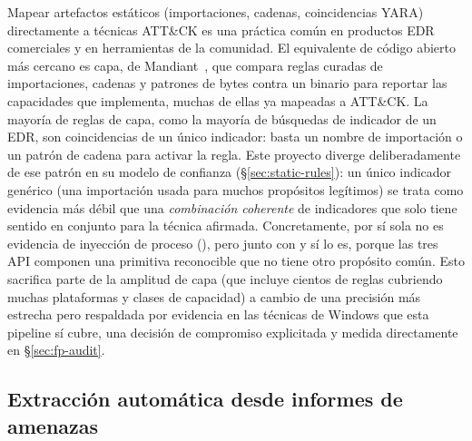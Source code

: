 Mapear artefactos est\'aticos (importaciones, cadenas, coincidencias
YARA) directamente a t\'ecnicas ATT\&CK es una pr\'actica com\'un en
productos EDR comerciales y en herramientas de la comunidad. El
equivalente de c\'odigo abierto m\'as cercano es capa, de
Mandiant~\cite{capa}, que compara reglas curadas de importaciones,
cadenas y patrones de bytes contra un binario para reportar las
capacidades que implementa, muchas de ellas ya mapeadas a ATT\&CK. La
mayor\'ia de reglas de capa, como la mayor\'ia de b\'usquedas de
indicador de un EDR, son coincidencias de un \'unico indicador: basta
un nombre de importaci\'on o un patr\'on de cadena para activar la
regla. Este proyecto diverge deliberadamente de ese patr\'on en su
modelo de confianza (\S\ref{sec:static-rules}): un \'unico indicador
gen\'erico (una importaci\'on usada para muchos prop\'ositos
leg\'itimos) se trata como evidencia m\'as d\'ebil que una
\emph{combinaci\'on coherente} de indicadores que solo tiene sentido en
conjunto para la t\'ecnica afirmada. Concretamente,
 por s\'i sola no es evidencia de inyecci\'on de
proceso (), pero  junto con
 y  s\'i lo es,
porque las tres API componen una primitiva reconocible que no tiene
otro prop\'osito com\'un. Esto sacrifica parte de la amplitud de capa
(que incluye cientos de reglas cubriendo muchas plataformas y clases de
capacidad) a cambio de una precisi\'on m\'as estrecha pero respaldada
por evidencia en las t\'ecnicas de Windows que esta pipeline s\'i
cubre, una decisi\'on de compromiso explicitada y medida directamente
en \S\ref{sec:fp-audit}.

\subsection{Extracci\'on autom\'atica desde informes de amenazas}

